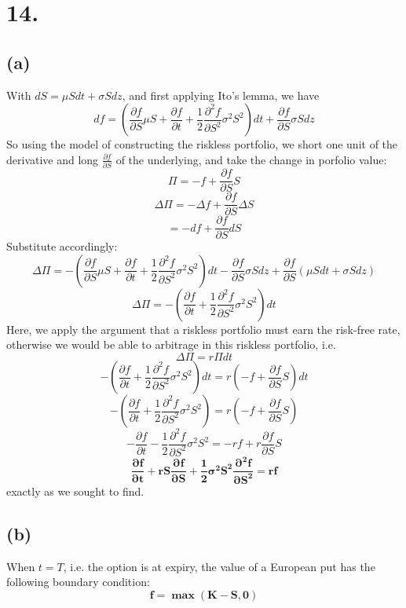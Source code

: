 \documentclass{article}
\begin{document}
{\Large 

\section*{14.}

\subsection*{(a)}

With \(dS = \mu S dt + \sigma S dz\), and first applying Ito's lemma, we have 
\[
  df = (\frac{\partial f}{\partial S} \mu S + \frac{\partial f}{\partial t} + \frac{1}{2} \frac{\partial^2 f}{\partial S^2}\sigma^2 S^2) dt + \frac{\partial f}{\partial S} \sigma S dz
\]
So using the model of constructing the riskless portfolio, we short one unit of the derivative and long \(\frac{\partial f}{\partial S}\) of the underlying, and take the change in porfolio value:
\[
  \Pi = -f + \frac{\partial f}{\partial S} S
\]
\[
  \Delta \Pi = - \Delta f + \frac{\partial f}{\partial S} \Delta S
\]
\[
  = - df + \frac{\partial f}{\partial S} dS
\]
Substitute accordingly:
\[
  \Delta \Pi = - (\frac{\partial f}{\partial S} \mu S + \frac{\partial f}{\partial t} + \frac{1}{2} \frac{\partial^2 f}{\partial S^2}\sigma^2 S^2) dt - \frac{\partial f}{\partial S} \sigma S dz + \frac{\partial f}{\partial S} (\mu S dt + \sigma S dz)
\]
\[
  \Delta \Pi = - (\frac{\partial f}{\partial t} + \frac{1}{2} \frac{\partial^2 f}{\partial S^2}\sigma^2 S^2) dt
\]
Here, we apply the argument that a riskless portfolio must earn the risk-free rate, otherwise we would be able to arbitrage in this riskless portfolio, i.e. 
\[
  \Delta \Pi = r \Pi dt
\]
\[
  - (\frac{\partial f}{\partial t} + \frac{1}{2} \frac{\partial^2 f}{\partial S^2}\sigma^2 S^2) dt = r (-f + \frac{\partial f}{\partial S} S) dt
\]
\[
  - (\frac{\partial f}{\partial t} + \frac{1}{2} \frac{\partial^2 f}{\partial S^2}\sigma^2 S^2) = r (-f + \frac{\partial f}{\partial S} S)
\]
\[
  - \frac{\partial f}{\partial t} - \frac{1}{2} \frac{\partial^2 f}{\partial S^2}\sigma^2 S^2 = -rf + r\frac{\partial f}{\partial S} S
\]
\[
  \boxed{ \mathbf{\frac{\partial f}{\partial t} + rS \frac{\partial f}{\partial S} + \frac{1}{2} \sigma^2 S^2 \frac{\partial^2 f}{\partial S^2} = rf}}
\]
exactly as we sought to find.

\subsection*{(b)}

When \(t = T\), i.e. the option is at expiry, the value of a European put has the following boundary condition:
\[
  \boxed{\mathbf{f = \max(K - S, 0)}}
\]

}
\end{document}
